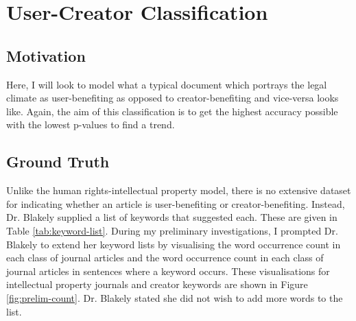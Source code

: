 	\section{User-Creator Classification}
		\subsection{Motivation}
			Here, I will look to model what a typical document which portrays the legal climate as user-benefiting as opposed to creator-benefiting and vice-versa looks like. Again, the aim of this classification is to get the highest accuracy possible with the lowest p-values to find a trend. 
		\subsection{Ground Truth}
			Unlike the human rights-intellectual property model, there is no extensive dataset for indicating whether an article is user-benefiting or creator-benefiting. Instead, Dr. Blakely supplied a list of keywords that suggested each. These are given in Table \ref{tab:keyword-list}. During my preliminary investigations, I prompted Dr. Blakely to extend her keyword lists by visualising the word occurrence count in each class of journal articles and the word occurrence count in each class of journal articles in sentences where a keyword occurs. These visualisations for intellectual property journals and creator keywords are shown in Figure \ref{fig:prelim-count}. Dr. Blakely stated she did not wish to add more words to the list.
			
